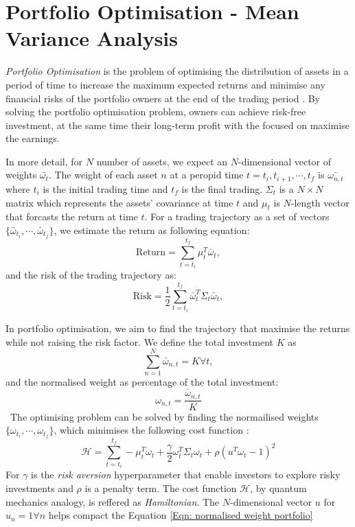 \section{Portfolio Optimisation - Mean Variance Analysis} \label{Sec: Portfolio Optimisation}

\emph{Portfolio Optimisation} is the problem of optimising the distribution of assets in a period of time to increase the maximum expected returns and minimise any financial risks of the portfolio owners at the end of the trading period \cite{abdelazizMultiobjectiveStochasticProgramming2007}.
By solving the portfolio optimisation problem, owners can achieve risk-free investment, at the same time their long-term profit with the focused on maximise the earnings.

In more detail, for $N$ number of assets, we expect an $N$-dimensional vector of weights $\bar{\omega_t}$.
The weight of each asset $n$ at a peropid time $t = t_i, t_{i+1}, \cdots, t_f$ is $\bar{\omega_{n,t}}$ where $t_i$ is the initial trading time and $t_f$ is the final trading.
$\Sigma_t$ is a $N \times N$ matrix which represents the assets' covariance at time $t$ and $\mu_t$ is $N$-length vector that forcasts the return at time $t$.
For a trading trajectory as a set of vectors $\{ \bar\omega_{t_i}, \cdots, \bar\omega_{t_f} \}$, we estimate the return as following equation:
\begin{equation}
    \text{Return} = \sum^{t_f}_{t=t_i}\mu^T_t \bar\omega_t,
\end{equation}
and the risk of the trading trajectory as:
\begin{equation}
    \text{Risk} = \frac{1}{2} \sum^{t_f}_{t=t_i} \bar\omega^T_t \Sigma_t \bar\omega_t,
\end{equation}

In portfolio optimisation, we aim to find the trajectory that maximise the returns while not raising the risk factor.
We define the total investment $K$ as
\begin{equation} \label{Eqn: normalised weight portfolio}
    \sum^N_{n=1} \bar\omega_{n,t} =  K \forall t,
\end{equation}
and the normalised weight as percentage of the total investment:
\begin{equation}
    \omega_{n,t} = \frac{\bar\omega_{n,t}}{K}
\end{equation}\
The optimising problem can be solved by finding the normailised weights $\{ \omega_{t_i}, \cdots, \omega_{t_f} \}$, which minimises the following cost function \cite{rosenbergSolvingOptimalTrading2015}:
\begin{equation}
    \mathcal{H} = \sum^{t_f}_{t=t_i} -\mu^T_t \omega_t + \frac{\gamma}{2}\omega^T_t \Sigma_t\omega_t + \rho(u^T\omega_t-1)^2
\end{equation}
For $\gamma$ is the \emph{risk aversion} hyperparameter that enable investors to explore risky investments and $\rho$ is a penalty term.
The cost function $\mathcal{H}$, by quantum mechanics analogy, is reffered as \emph{Hamiltonian}.
The $N$-dimensional vector $u$ for $u_n = 1 \forall n$ helps compact the Equation \ref{Eqn: normalised weight portfolio}

